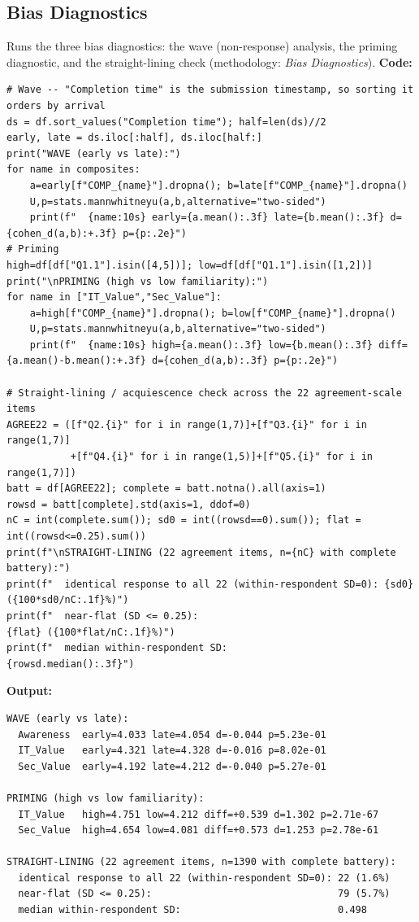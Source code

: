 \subsection{Bias Diagnostics}
Runs the three bias diagnostics: the wave (non-response) analysis, the priming diagnostic, and the straight-lining check (methodology: \emph{Bias Diagnostics}).
\noindent\textbf{Code:}\nopagebreak
{\tiny\begin{verbatim}
# Wave -- "Completion time" is the submission timestamp, so sorting it orders by arrival
ds = df.sort_values("Completion time"); half=len(ds)//2
early, late = ds.iloc[:half], ds.iloc[half:]
print("WAVE (early vs late):")
for name in composites:
    a=early[f"COMP_{name}"].dropna(); b=late[f"COMP_{name}"].dropna()
    U,p=stats.mannwhitneyu(a,b,alternative="two-sided")
    print(f"  {name:10s} early={a.mean():.3f} late={b.mean():.3f} d={cohen_d(a,b):+.3f} p={p:.2e}")
# Priming
high=df[df["Q1.1"].isin([4,5])]; low=df[df["Q1.1"].isin([1,2])]
print("\nPRIMING (high vs low familiarity):")
for name in ["IT_Value","Sec_Value"]:
    a=high[f"COMP_{name}"].dropna(); b=low[f"COMP_{name}"].dropna()
    U,p=stats.mannwhitneyu(a,b,alternative="two-sided")
    print(f"  {name:10s} high={a.mean():.3f} low={b.mean():.3f} diff={a.mean()-b.mean():+.3f} d={cohen_d(a,b):.3f} p={p:.2e}")

# Straight-lining / acquiescence check across the 22 agreement-scale items
AGREE22 = ([f"Q2.{i}" for i in range(1,7)]+[f"Q3.{i}" for i in range(1,7)]
           +[f"Q4.{i}" for i in range(1,5)]+[f"Q5.{i}" for i in range(1,7)])
batt = df[AGREE22]; complete = batt.notna().all(axis=1)
rowsd = batt[complete].std(axis=1, ddof=0)
nC = int(complete.sum()); sd0 = int((rowsd==0).sum()); flat = int((rowsd<=0.25).sum())
print(f"\nSTRAIGHT-LINING (22 agreement items, n={nC} with complete battery):")
print(f"  identical response to all 22 (within-respondent SD=0): {sd0} ({100*sd0/nC:.1f}%)")
print(f"  near-flat (SD <= 0.25):                                {flat} ({100*flat/nC:.1f}%)")
print(f"  median within-respondent SD:                           {rowsd.median():.3f}")
\end{verbatim}}
\noindent\textbf{Output:}\nopagebreak
{\scriptsize\begin{verbatim}
WAVE (early vs late):
  Awareness  early=4.033 late=4.054 d=-0.044 p=5.23e-01
  IT_Value   early=4.321 late=4.328 d=-0.016 p=8.02e-01
  Sec_Value  early=4.192 late=4.212 d=-0.040 p=5.27e-01

PRIMING (high vs low familiarity):
  IT_Value   high=4.751 low=4.212 diff=+0.539 d=1.302 p=2.71e-67
  Sec_Value  high=4.654 low=4.081 diff=+0.573 d=1.253 p=2.78e-61

STRAIGHT-LINING (22 agreement items, n=1390 with complete battery):
  identical response to all 22 (within-respondent SD=0): 22 (1.6%)
  near-flat (SD <= 0.25):                                79 (5.7%)
  median within-respondent SD:                           0.498
\end{verbatim}}

